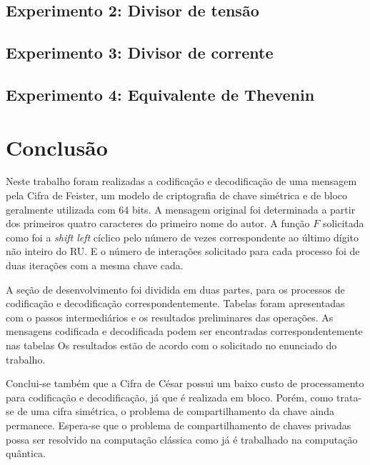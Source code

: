 \documentclass[a4paper,pra,aps,twocolumn,superscriptaddress,10pt,final]{revtex4-2}
\begin{document}
\subsection{Experimento 2: Divisor de tensão}
\label{subsec:ana_div_tens}



\subsection{Experimento 3: Divisor de corrente}
\label{subsec:ana_div_corr}


\subsection{Experimento 4: Equivalente de Thevenin}
\label{subsec:ana_equiv_the}


\section{Conclusão}
\label{sec:conclusion}
    
    Neste trabalho foram realizadas a codificação e decodificação de uma mensagem pela Cifra de Feister, um modelo de criptografia de chave simétrica e de bloco geralmente utilizada com 64 bits. A mensagem original foi determinada a partir dos primeiros quatro caracteres do primeiro nome do autor. A função $F$ solicitada como foi a \textit{shift left} cíclico pelo número de vezes correspondente ao último dígito não inteiro do RU. E o número de interações solicitado para cada processo foi de duas iterações com a mesma chave cada.
    
    A seção de desenvolvimento foi dividida em duas partes, para os processos de codificação e decodificação correspondentemente. Tabelas foram apresentadas com o passos intermediários e os resultados preliminares das operações. As mensagens codificada e decodificada podem ser encontradas correspondentemente nas tabelas Os resultados estão de acordo com o solicitado no enunciado do trabalho.

    Conclui-se também que a Cifra de César possui um baixo custo de processamento para codificação e decodificação, já que é realizada em bloco. Porém, como trata-se de uma cifra simétrica, o problema de  compartilhamento da chave ainda permanece. Espera-se que o problema de compartilhamento de chaves privadas possa ser resolvido na computação clássica como já é trabalhado na computação quântica.

    \vspace{-0.5cm}
\end{document}
